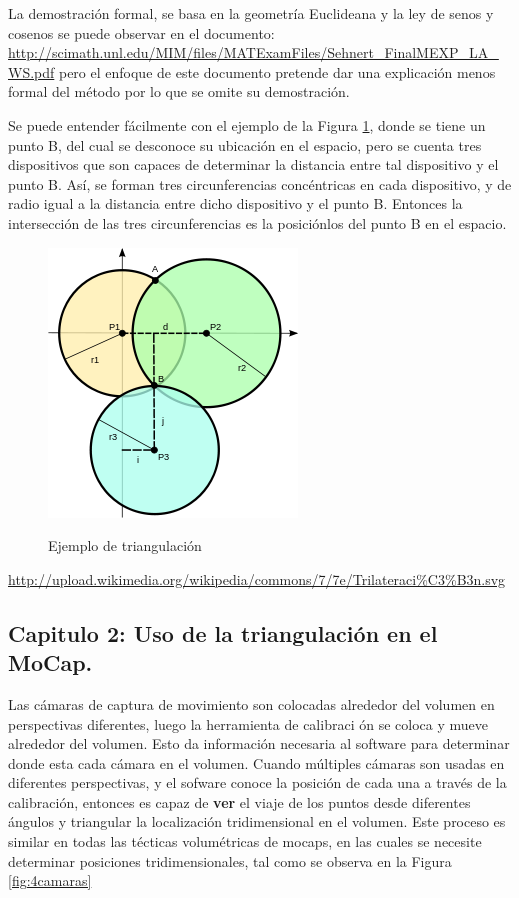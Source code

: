 \documentclass[11pt,letterpaper]{article}     %
\begin{document}
La demostraci\' on formal, se basa en la geometr\' ia Euclideana y la ley de senos y cosenos se puede observar en el documento:  \url{http://scimath.unl.edu/MIM/files/MATExamFiles/Sehnert_FinalMEXP_LA_WS.pdf}
 pero el enfoque de este documento pretende dar una explicaci\' on menos formal del m\' etodo por lo que se omite su demostraci\' on. 
 
 Se puede entender f\'  acilmente con el ejemplo de la Figura \ref{fig:ejemplo1}, donde se tiene un punto B, del cual se desconoce su ubicaci\' on en el espacio, pero se cuenta tres dispositivos que son capaces de determinar la distancia entre tal dispositivo y el punto B. As\' i, se forman tres circunferencias conc\' entricas en cada dispositivo, y de radio igual a la distancia entre dicho dispositivo y el punto B. Entonces la intersecci\' on de las tres circunferencias es la posici\' onlos  del punto B en el espacio.

\begin{figure}[hbtp]
\caption{Ejemplo de triangulaci\' on}
\centering
\includegraphics[scale=1]{imagenes/250px-Trilateration.png}
\label{fig:ejemplo1}
\end{figure}

\url{http://upload.wikimedia.org/wikipedia/commons/7/7e/Trilateraci%C3%B3n.svg}

 

\subsection{Capitulo 2: Uso de la triangulaci\' on en el MoCap.}

Las c\' amaras de captura de movimiento son colocadas alrededor del volumen en perspectivas diferentes, luego la herramienta de calibraci \' on se coloca y mueve alrededor del volumen. Esto da informaci\' on necesaria al software para determinar donde esta cada c\' amara en el volumen. Cuando m\' ultiples c\' amaras son usadas en diferentes perspectivas, y el sofware conoce la posici\' on de cada una a trav\' es de la calibraci\' on, entonces es capaz de \textbf{ver} el viaje de los puntos desde diferentes \' angulos y triangular la localizaci\' on tridimensional en el volumen. Este proceso es similar en todas las t\' ecticas volum\' etricas de mocaps, en las cuales se necesite determinar posiciones tridimensionales, tal como se observa en la Figura \ref{fig:4camaras}
\end{document}
